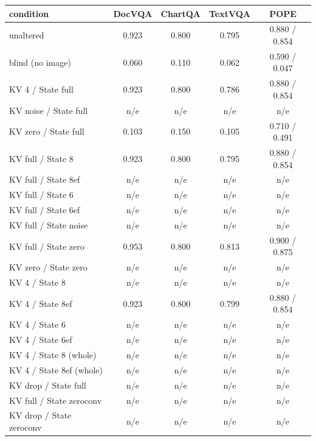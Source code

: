 \begin{tabular}{lcccc}
\toprule
condition & DocVQA & ChartQA & TextVQA & POPE \\
\midrule
unaltered & 0.923 & 0.800 & 0.795 & 0.880 / 0.854 \\
blind (no image) & 0.060 & 0.110 & 0.062 & 0.590 / 0.047 \\
KV 4 / State full & 0.923 & 0.800 & 0.786 & 0.880 / 0.854 \\
KV noise / State full & n/e & n/e & n/e & n/e \\
KV zero / State full & 0.103 & 0.150 & 0.105 & 0.710 / 0.491 \\
KV full / State 8 & 0.923 & 0.800 & 0.795 & 0.880 / 0.854 \\
KV full / State 8ef & n/e & n/e & n/e & n/e \\
KV full / State 6 & n/e & n/e & n/e & n/e \\
KV full / State 6ef & n/e & n/e & n/e & n/e \\
KV full / State noise & n/e & n/e & n/e & n/e \\
KV full / State zero & 0.953 & 0.800 & 0.813 & 0.900 / 0.875 \\
KV zero / State zero & n/e & n/e & n/e & n/e \\
KV 4 / State 8 & n/e & n/e & n/e & n/e \\
KV 4 / State 8ef & 0.923 & 0.800 & 0.799 & 0.880 / 0.854 \\
KV 4 / State 6 & n/e & n/e & n/e & n/e \\
KV 4 / State 6ef & n/e & n/e & n/e & n/e \\
KV 4 / State 8 (whole) & n/e & n/e & n/e & n/e \\
KV 4 / State 8ef (whole) & n/e & n/e & n/e & n/e \\
KV drop / State full & n/e & n/e & n/e & n/e \\
KV full / State zeroconv & n/e & n/e & n/e & n/e \\
KV drop / State zeroconv & n/e & n/e & n/e & n/e \\
\bottomrule
\end{tabular}
